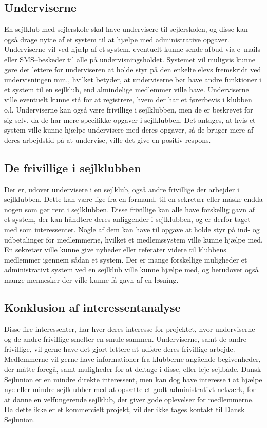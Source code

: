 \subsection{Underviserne}

En sejlklub med sejlerskole skal have undervisere til sejlerskolen, og disse kan også drage nytte af et system til at hjælpe med administrative opgaver. 
Underviserne vil ved hjælp af et system, eventuelt kunne sende afbud via e--mails eller SMS--beskeder til alle på undervisningsholdet. 
Systemet vil muligvis kunne gøre det lettere for underviseren at holde styr på den enkelte elevs fremskridt ved undervisningen mm., hvilket betyder, at underviserne bør have andre funktioner i et system til en sejlklub, end almindelige medlemmer ville have.
Underviserne ville eventuelt kunne stå for at registrere, hvem der har et førerbevis i klubben o.l.
Underviserne kan også være frivillige i sejlklubben, men de er beskrevet for sig selv, da de har mere specifikke opgaver i sejlklubben.
Det antages, at hvis et system ville kunne hjælpe undervisere med deres opgaver, så de bruger mere af deres arbejdstid på at undervise, ville det give en positiv respons. 


\subsection{De frivillige i sejlklubben}

Der er, udover undervisere i en sejlklub, også andre frivillige der arbejder i sejlklubben.
Dette kan være lige fra en formand, til en sekretær eller måske endda nogen som gør rent i sejlklubben. 
Disse frivillige kan alle have forskellig gavn af et system, der kan håndtere deres anliggender i sejlklubben, og er derfor taget med som interessenter. 
Nogle af dem kan have til opgave at holde styr på ind- og udbetalinger for medlemmerne, hvilket et medlemssystem ville kunne hjælpe med. 
En sekretær ville kunne give nyheder eller referater videre til klubbens medlemmer igennem sådan et system. 
Der er mange forskellige muligheder et administrativt system ved en sejlklub ville kunne hjælpe med, og herudover også mange mennesker der ville kunne få gavn af en løsning.


\subsection{Konklusion af interessentanalyse}

Disse fire interessenter, har hver deres interesse for projektet, hvor underviserne og de andre frivillige smelter en smule sammen. 
Underviserne, samt de andre frivillige, vil gerne have det gjort lettere at udføre deres frivillige arbejde.
Medlemmerne vil gerne have informationer fra klubberne angående begivenheder, der måtte foregå, samt muligheder for at deltage i disse, eller leje sejlbåde.
Dansk Sejlunion er en mindre direkte interessent, men kan dog have interesse i at hjælpe nye eller mindre sejlklubber med at opsætte et godt administrativt netværk, for at danne en velfungerende sejlklub, der giver gode oplevelser for medlemmerne.
Da dette ikke er et kommercielt projekt, vil der ikke tages kontakt til Dansk Sejlunion.

